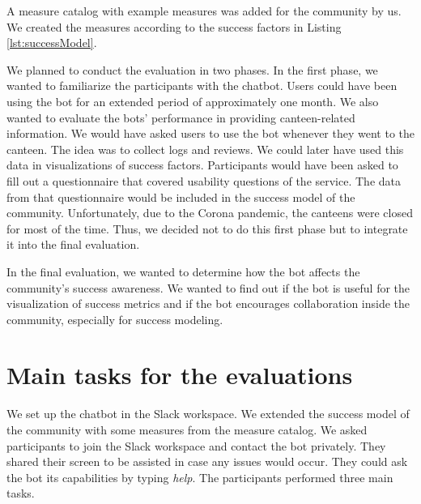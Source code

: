 A measure catalog with example measures was added for the community by us. We created the measures according to the success factors in Listing \ref{lst:successModel}.

We planned to conduct the evaluation in two phases.
In the first phase, we wanted to familiarize the participants with the chatbot.
Users could have been using the bot for an extended period of approximately one month. 
We also wanted to evaluate the bots' performance in providing canteen-related information.
We would have asked users to use the bot whenever they went to the canteen. 
The idea was to collect logs and reviews. We could later have used this data in visualizations of success factors. 
Participants would have been asked to fill out a questionnaire that covered usability questions of the service. The data from that questionnaire would be included in the success model of the community.
Unfortunately, due to the Corona pandemic, the canteens were closed for most of the time. Thus, we decided not to do this first phase but to integrate it into the final evaluation.

In the final evaluation, we wanted to determine how the bot affects the community's success awareness.
We wanted to find out if the bot is useful for the visualization of success metrics and if the bot encourages collaboration inside the community, especially for success modeling.



\section{Main tasks for the evaluations}

We set up the chatbot in the Slack workspace. 
We extended the success model of the community with some measures from the measure catalog. 
We asked participants to join the Slack workspace and contact the bot privately. They shared their screen to be assisted in case any issues would occur. They could ask the bot its capabilities by typing \emph{help}.
The participants performed three main tasks.

